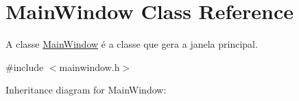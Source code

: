 \hypertarget{classMainWindow}{}\section{Main\+Window Class Reference}
\label{classMainWindow}


A classe \hyperlink{classMainWindow}{Main\+Window} é a classe que gera a janela principal.  




{\ttfamily \#include $<$mainwindow.\+h$>$}



Inheritance diagram for Main\+Window\+:
